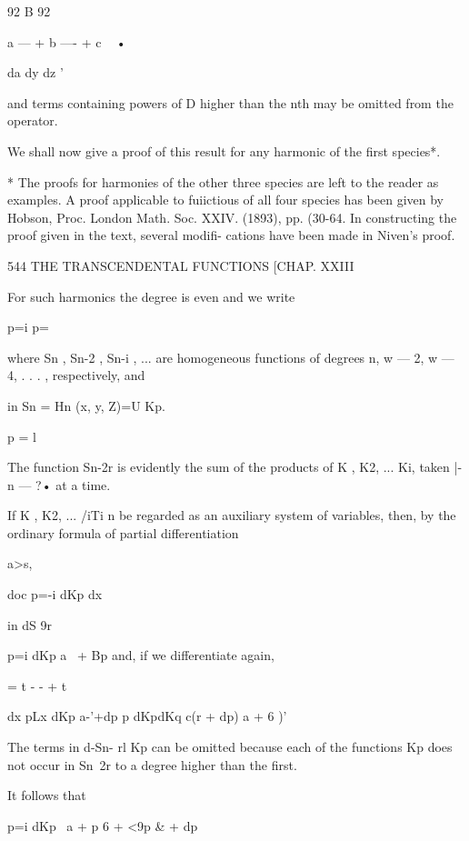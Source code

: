 {92 B  92 

a — + b —- + c ~ • 

da  dy  dz  ' 

and terms containing powers of D higher than the nth may be omitted from 
the operator. 

We shall now give a proof of this result for any harmonic of the first species*. 

* The proofs for harmonies of the other three species are left to the reader as examples. 
A proof applicable to fuiictious of all four species has been given by Hobson, Proc. London 
Math. Soc. XXIV. (1893), pp. (30-64. In constructing the proof given in the text, several modifi- 
cations have been made in Niven's proof. 



544 THE TRANSCENDENTAL FUNCTIONS [CHAP. XXIII 

For such harmonics the degree is even and we write 

p=i p=\ 

where Sn , Sn-2 , Sn-i , ... are homogeneous functions of degrees n, w — 2, w — 4, . . . , 
respectively, and 

in 
Sn = Hn (x, y, Z)=U Kp. 

p = l 

The function Sn-2r is evidently the sum of the products of K , K2, ... Ki,  
taken |- n — ?• at a time. 

If K , K2, ... /iTi n be regarded as an auxiliary system of variables, then, by 
the ordinary formula of partial differentiation 



a>s, 






doc p=-i dKp dx 

in dS 9r 

p=i dKp a~ + Bp 
and, if we differentiate again, 



= t - - + t 



dx  pLx dKp a-'+dp p dKpdKq c(r + dp) a  + 6 )' 

The terms in d-Sn- rl Kp  can be omitted because each of the functions 
Kp does not occur in Sn\ 2r to a degree higher than the first. 

It follows that 



p=i dKp \ a  +  p 6  + <9p \& + dp\ 






}
